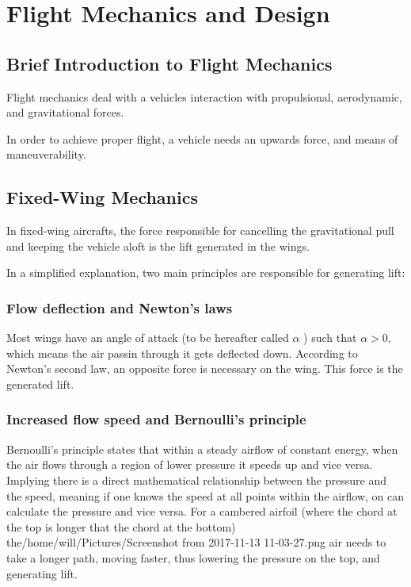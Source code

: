 
\chapter{Flight Mechanics and Design} \label{chap:4}

\section{Brief Introduction to Flight Mechanics}

Flight mechanics deal with a vehicles interaction with propulsional, aerodynamic, and gravitational forces.

In order to achieve proper flight, a vehicle needs an upwards force, and means of maneuverability. 


\section{Fixed-Wing Mechanics}

In fixed-wing aircrafts, the force responsible for cancelling the gravitational pull and keeping the vehicle aloft is the lift generated in the wings.

In a simplified explanation, two main principles are responsible for generating lift:

\subsection{Flow deflection and Newton's laws}

Most wings have an angle of attack (to be hereafter called $\alpha$ ) such that $\alpha > 0$, which means the air passin through it gets deflected down. According to Newton's second law, an opposite force is necessary on the wing. This force is the generated lift.

\subsection{Increased flow speed and Bernoulli's principle}

Bernoulli's principle states that within a steady airflow of constant energy, when the air flows through a region of lower pressure it speeds up and vice versa. Implying there is a direct mathematical relationship between the pressure and the speed, meaning if one knows the speed at all points within the airflow, on can calculate the pressure and vice versa. For a cambered airfoil (where the chord at the top is longer that the chord at the bottom) the/home/will/Pictures/Screenshot from 2017-11-13 11-03-27.png air needs to take a longer path, moving faster, thus lowering the pressure on the top, and generating lift.


